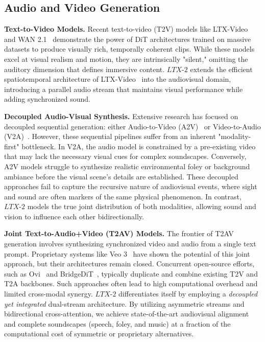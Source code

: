 \documentclass{article}
\begin{document}
\subsection{Audio and Video Generation}

\textbf{Text-to-Video Models.}
Recent text-to-video (T2V) models like LTX-Video~\cite{hacohen2024ltx} and WAN 2.1~\cite{wang2025wan} demonstrate the power of DiT architectures trained on massive datasets to produce visually rich, temporally coherent clips. While these models excel at visual realism and motion, they are intrinsically "silent," omitting the auditory dimension that defines immersive content. $\textit{LTX-2}$ extends the efficient spatiotemporal architecture of LTX-Video~\cite{hacohen2024ltx} into the audiovisual domain, introducing a parallel audio stream that maintains visual performance while adding synchronized sound.

\textbf{Decoupled Audio-Visual Synthesis.}
Extensive research has focused on decoupled sequential generation: either Audio-to-Video (A2V)~\cite{luo2023difffoley, gao2025wan} or Video-to-Audio (V2A)~\cite{zhang2024foleycrafter, cheng2025mmaudio, benita2025cafa}. However, these sequential pipelines suffer from an inherent "modality-first" bottleneck. In V2A, the audio model is constrained by a pre-existing video that may lack the necessary visual cues for complex soundscapes. Conversely, A2V models struggle to synthesize realistic environmental foley or background ambiance before the visual scene's details are established. These decoupled approaches fail to capture the recursive nature of audiovisual events, where sight and sound are often markers of the same physical phenomenon.
In contrast, $\textit{LTX-2}$ models the true joint distribution of both modalities, allowing sound and vision to influence each other bidirectionally.

\textbf{Joint Text-to-Audio+Video (T2AV) Models.}
The frontier of T2AV generation involves synthesizing synchronized video and audio from a single text prompt. Proprietary systems like Veo 3~\cite{veo32025} have shown the potential of this joint approach, but their architectures remain closed. Concurrent open-source efforts, such as Ovi~\cite{ovi2025} and BridgeDiT~\cite{bridge2025}, typically duplicate and combine existing T2V and T2A backbones. Such approaches often lead to high computational overhead and limited cross-modal synergy. $\textit{LTX-2}$ differentiates itself by employing a \textit{decoupled yet integrated} dual-stream architecture. By utilizing asymmetric streams and bidirectional cross-attention, we achieve state-of-the-art audiovisual alignment and complete soundscapes (speech, foley, and music) at a fraction of the computational cost of symmetric or proprietary alternatives.
\end{document}

